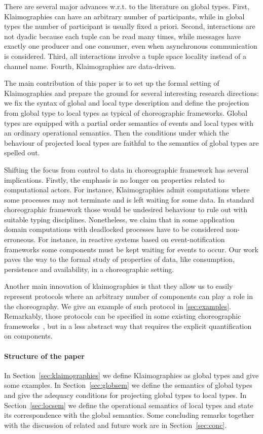 There are several major advances w.r.t. to the literature on global types.
First, Klaimographies can have an arbitrary number of participants, while in global types the number of participant is usually fixed a priori.
Second, interactions are not dyadic because each tuple can be read many times, while messages have exactly one producer and one consumer, even when asynchronous communication is considered.
Third, all interactions involve a tuple space locality instead of a channel name.
Fourth, Klaimographies are data-driven.

The main contribution of this paper is to set up the formal setting of Klaimographies and prepare the ground for several interesting research directions: we fix the syntax of global and local type description and define the projection from global type to local types as typical of choreographic frameworks.
Global types are equipped with a partial order semantics of events and local types with an ordinary operational semantics. Then the conditions under which the behaviour of projected local types are faithful to the semantics of global types are spelled out. 

Shifting the focus from control to data in choreographic framework has
several implications.
%
Firstly, the emphasis is no longer on properties related to
computational actors.
%
For instance, Klaimographies admit computations where some processes
may not terminate and is left waiting for some data.
%
In standard choreographic framework those would be undesired behaviour
to rule out with suitable typing disciplines.
%
Nonetheless, we claim that in some application domain computations with
deadlocked processes have to be considered non-erroneous.
%
For instance, in reactive systems based on event-notification
frameworks some  components must be kept waiting for
events to occur.
%
Our work paves the way to the formal study of properties of data, like consumption, persistence and availability, in a choreographic setting.

Another main innovation of klaimographies is that they allow us to easily
represent protocols where an arbitrary number of components can
play a role in the choreography.
%
We give an example of such protocol in \cref{sec:examples}.
%
Remarkably, those protocols can be specified in some existing
choreographic frameworks~\cite{ydbh10,chjny19}, but in a less abstract way
that requires the explicit quantification on components.

\paragraph{Structure of the paper}
In Section~\ref{sec:klaimographies} we define Klaimographies as global types and give some examples.
In Section~\ref{sec:globsem} we define the semantics of global types and give the adequacy conditions for projecting global types to local types.
In Section~\ref{sec:locsem} we define the operational semantics of local types and state its correspondence with the global semantics.
Some concluding remarks together with the discussion of related and future work are in Section~\ref{sec:conc}.


